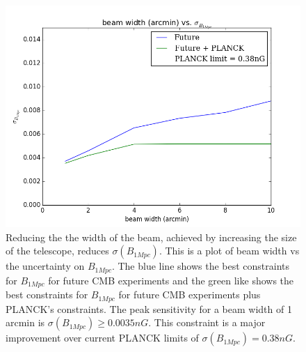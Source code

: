 \begin{figure}[h]
\centering
\includegraphics[scale=0.7]{images/width.png}
\caption{Reducing the the width of the beam, achieved by increasing the size of the telescope, reduces $\sigma(B_{1Mpc})$. This is a plot of beam width vs the uncertainty on $B_{1Mpc}$. The blue line shows the best constraints for $B_{1Mpc}$ for future CMB experiments and the green like shows the best constraints for $B_{1Mpc}$ for future CMB experiments plus PLANCK's constraints. The peak sensitivity for a beam width of 1 arcmin is $\sigma(B_{1Mpc}) \geq 0.0035nG$. This constraint is a major improvement over current PLANCK limits of $\sigma(B_{1Mpc}) = 0.38nG$.}
\label{fig:width}
\end{figure}

